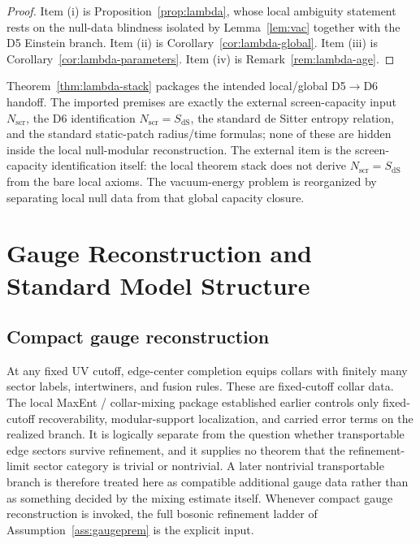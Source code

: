 \documentclass[11pt]{article}
\begin{document}
\begin{proof}
Item \textup{(i)} is Proposition~\ref{prop:lambda}, whose local ambiguity statement rests on the null-data blindness isolated by Lemma~\ref{lem:vac} together with the D5 Einstein branch. Item \textup{(ii)} is Corollary~\ref{cor:lambda-global}. Item \textup{(iii)} is Corollary~\ref{cor:lambda-parameters}. Item \textup{(iv)} is Remark~\ref{rem:lambda-age}.
\end{proof}

Theorem~\ref{thm:lambda-stack} packages the intended local/global D5\(\to\)D6 handoff. The imported premises are exactly the external screen-capacity input \(N_{\mathrm{scr}}\), the D6 identification \(N_{\mathrm{scr}}=S_{\mathrm{dS}}\), the standard de Sitter entropy relation, and the standard static-patch radius/time formulas; none of these are hidden inside the local null-modular reconstruction. The external item is the screen-capacity identification itself: the local theorem stack does not derive \(N_{\mathrm{scr}}=S_{\mathrm{dS}}\) from the bare local axioms. The vacuum-energy problem is reorganized by separating local null data from that global capacity closure.

\section{Gauge Reconstruction and Standard Model Structure}

\subsection{Compact gauge reconstruction}

At any fixed UV cutoff, edge-center completion equips collars with finitely many sector labels, intertwiners, and fusion rules. These are fixed-cutoff collar data. The local MaxEnt / collar-mixing package established earlier controls only fixed-cutoff recoverability, modular-support localization, and carried error terms on the realized branch. It is logically separate from the question whether transportable edge sectors survive refinement, and it supplies no theorem that the refinement-limit sector category is trivial or nontrivial. A later nontrivial transportable branch is therefore treated here as compatible additional gauge data rather than as something decided by the mixing estimate itself. Whenever compact gauge reconstruction is invoked, the full bosonic refinement ladder of Assumption~\ref{ass:gaugeprem} is the explicit input.
\end{document}
